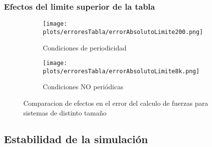 % 
% 
% 
% 


\subsubsection{Efectos del limite superior de la tabla}

\begin{figure}[htbp]
\centering
\begin{subfigure}[b]{\plotwidthtres}
   \texttt{[image: plots/erroresTabla/errorAbsolutoLimite200.png]}
   \caption{Condiciones de periodicidad}
   \label{compar-1iter}
 \end{subfigure}
\begin{subfigure}[b]{\plotwidthtres}
   \texttt{[image: plots/erroresTabla/errorAbsolutoLimite8k.png]}
   \caption{Condiciones NO periódicas}
   \label{compar-niter}
 \end{subfigure}
 \caption{Comparacion de efectos en el error del calculo de fuerzas para sistemas de distinto tamaño}
 \label{time-vs-cut}
\end{figure}





\subsection{Estabilidad de la simulación}


